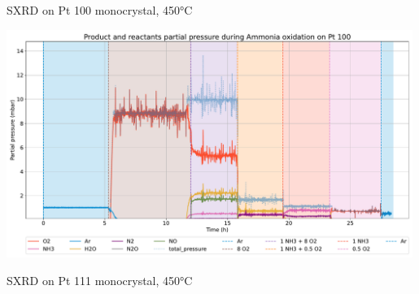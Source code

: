 \begin{frame}{SXRD on Pt 100 monocrystal, 450°C}

	\includegraphics[width=0.99\textwidth]{Figures/gas_analysis/XPS/pt_100_total_pressure_norm.pdf}

\end{frame}

\begin{frame}{SXRD on Pt 111 monocrystal, 450°C}


\end{frame}